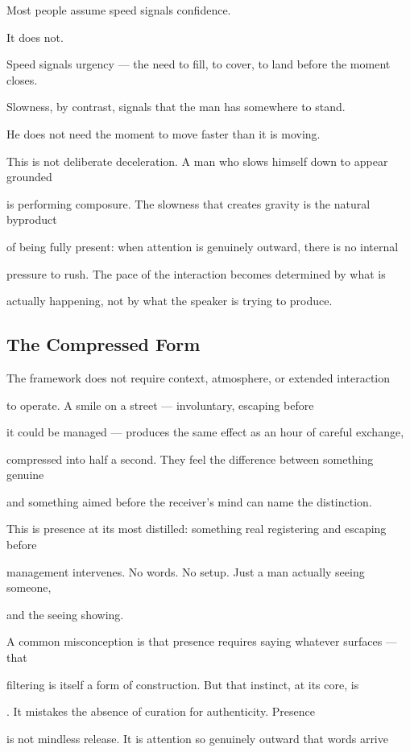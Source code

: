 Most people assume speed signals confidence.

It does not.

Speed signals urgency --- the need to fill, to cover, to land before the moment closes.

Slowness, by contrast, signals that the man has somewhere to stand.

He does not need the moment to move faster than it is moving.

This is not deliberate deceleration. A man who slows himself down to appear grounded

is performing composure. The slowness that creates gravity is the natural byproduct

of being fully present: when attention is genuinely outward, there is no internal

pressure to rush. The pace of the interaction becomes determined by what is

actually happening, not by what the speaker is trying to produce.

\subsection{The Compressed Form}

The framework does not require context, atmosphere, or extended interaction

to operate. A smile on a street --- involuntary, escaping before

it could be managed --- produces the same effect as an hour of careful exchange,

compressed into half a second. They feel the difference between something genuine

and something aimed before the receiver's mind can name the distinction.

This is presence at its most distilled: something real registering and escaping before

management intervenes. No words. No setup. Just a man actually seeing someone,

and the seeing showing.

A common misconception is that presence requires saying whatever surfaces --- that

filtering is itself a form of construction. But that instinct, at its core, is

. It mistakes the absence of curation for authenticity. Presence

is not mindless release. It is attention so genuinely outward that words arrive

